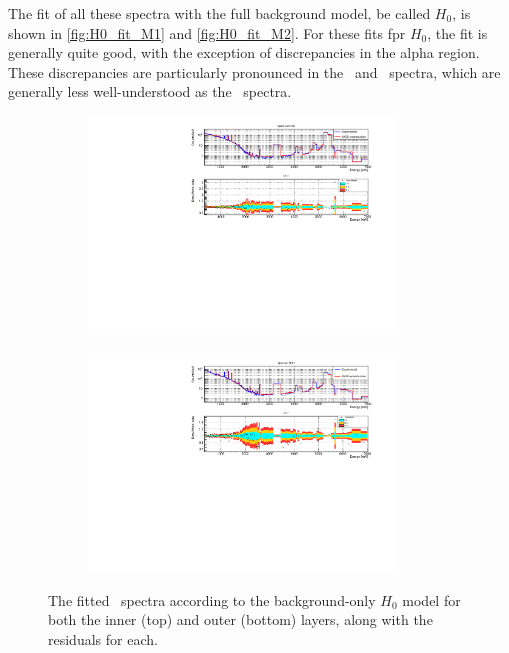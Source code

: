 The fit of all these spectra with the full background model, be called $H_0$, is shown in \autoref{fig:H0_fit_M1} and \autoref{fig:H0_fit_M2}.
For these fits fpr $H_0$, the fit is generally quite good, with the exception of discrepancies in the alpha region.
These discrepancies are particularly pronounced in the \Mtwo~and \Msum~spectra, which are generally less well-understood as the \Mone~spectra.
\begin{figure}[htbp]
\centering
\begin{subfigure}[t]{\textwidth}
\includegraphics[width=0.9\textwidth]{Figures/2nu_M1L0.pdf}
\end{subfigure}
\par\bigskip\bigskip
\begin{subfigure}[t]{\textwidth}
\includegraphics[width=0.9\textwidth]{Figures/2nu_M1L1.pdf}
\end{subfigure}
\caption[The fitted \Mone~spectra according to the $H_0$ model]
{The fitted \Mone~spectra according to the background-only $H_0$ model for both the inner (top) and outer (bottom) layers, along with the residuals for each.}
\label{fig:H0_fit_M1}
\end{figure}
